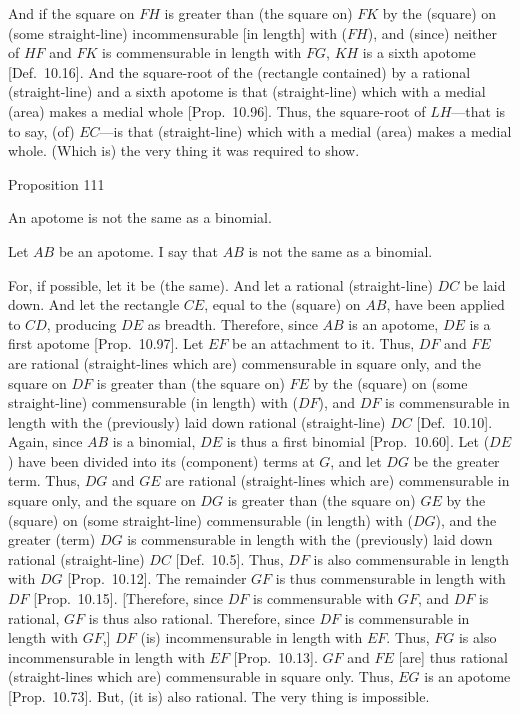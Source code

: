 And if the square on $FH$ is greater than (the square on) $FK$ by the
(square) on (some straight-line) incommensurable [in length] with ($FH$), 
and (since) neither of $HF$ and $FK$ is commensurable in length
with $FG$, $KH$ is a sixth apotome [Def.~10.16].
And the square-root of the (rectangle contained) by a rational (straight-line) and a sixth apotome is that (straight-line) which with a medial (area)
makes a medial whole [Prop.~10.96]. Thus,
the square-root of $LH$---that is to say, (of) $EC$---is 
that (straight-line) which with a medial (area) makes a medial whole.
(Which is) the very thing it was required to show.


\begin{center}
{\large Proposition 111}
\end{center}

An apotome is not the same as a binomial.

\epsfysize=2.4in
\centerline{}

Let $AB$ be an apotome. I say that $AB$ is not the same as a binomial.

For, if possible, let it be (the same). And let a rational (straight-line)
$DC$ be laid down. And let the rectangle $CE$, equal to the (square) on $AB$, have been applied to $CD$, producing $DE$ as breadth. Therefore,
since $AB$ is an apotome, $DE$ is a first apotome [Prop.~10.97]. Let $EF$ be an attachment to it.
Thus, $DF$ and $FE$ are rational (straight-lines which are) commensurable
in square only, and the square on $DF$ is greater than (the square on)
$FE$ by the (square) on (some straight-line) commensurable (in length)
with ($DF$), and $DF$ is commensurable in length with the (previously)
laid down rational (straight-line) $DC$ [Def.~10.10]. 
Again, since $AB$ is a binomial, $DE$ is thus a first binomial [Prop.~10.60]. Let ($DE$) have been divided
into its (component) terms at $G$, and let $DG$ be the greater term.
Thus, $DG$ and $GE$ are rational (straight-lines which are)
commensurable in square only, and the square on $DG$ is greater
than (the square on) $GE$ by the (square) on (some straight-line)
commensurable (in length) with ($DG$), and the greater (term)
$DG$ is commensurable in length with the (previously)
laid down rational (straight-line) $DC$ [Def.~10.5].
Thus, $DF$ is also commensurable in length with $DG$ [Prop.~10.12].
The remainder $GF$ is thus commensurable in length with $DF$
[Prop.~10.15]. [Therefore, since
$DF$ is commensurable with $GF$, and $DF$ is rational, $GF$
is thus also rational. Therefore, since $DF$ is commensurable
in length with $GF$,] $DF$ (is) incommensurable in length with $EF$.
Thus, $FG$ is also incommensurable in length with $EF$ [Prop.~10.13]. $GF$ and $FE$ [are] thus
rational (straight-lines which are) commensurable in square only.
Thus, $EG$ is an apotome [Prop.~10.73].
But, (it is) also rational. The very thing is impossible.


